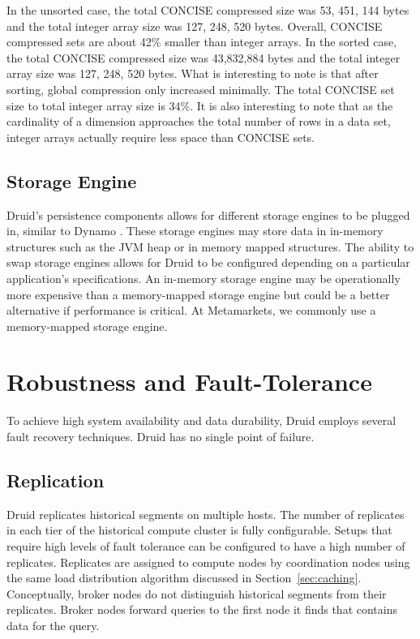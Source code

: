 \documentclass{vldb}
\begin{document}
In the unsorted case, the total CONCISE compressed size was 53, 451,
144 bytes and the total integer array size was 127, 248, 520
bytes. Overall, CONCISE compressed sets are about 42\% smaller
than integer arrays.  In the sorted case, the total CONCISE compressed
size was 43,832,884 bytes and the total integer array size was 127,
248, 520 bytes. What is interesting to note is that after sorting,
global compression only increased minimally. The total CONCISE set
size to total integer array size is 34\%. It is also
interesting to note that as the cardinality of a dimension approaches
the total number of rows in a data set, integer arrays actually
require less space than CONCISE sets.

\subsection{Storage Engine}
Druid’s persistence components allows for different storage engines to
be plugged in, similar to Dynamo \cite{decandia2007dynamo}. These storage engines may store
data in in-memory structures such as the JVM heap or in memory mapped
structures. The ability to swap storage engines allows for Druid to be
configured depending on a particular application’s specifications. An
in-memory storage engine may be operationally more expensive than a
memory-mapped storage engine but could be a better alternative if
performance is critical. At Metamarkets, we commonly use a
memory-mapped storage engine.

\section{Robustness and Fault-Tolerance}
\label{sec:robustness}
To achieve high system availability and data durability, Druid employs
several fault recovery techniques. Druid has no single point of
failure.

\subsection{Replication}
Druid replicates historical segments on multiple hosts. The number of
replicates in each tier of the historical compute cluster is fully
configurable. Setups that require high levels of fault tolerance can
be configured to have a high number of replicates. Replicates are
assigned to compute nodes by coordination nodes using the same load
distribution algorithm discussed in Section~\ref{sec:caching}. Conceptually,
broker nodes do not distinguish historical segments from their
replicates. Broker nodes forward queries to the first node it finds
that contains data for the query.
\end{document}
